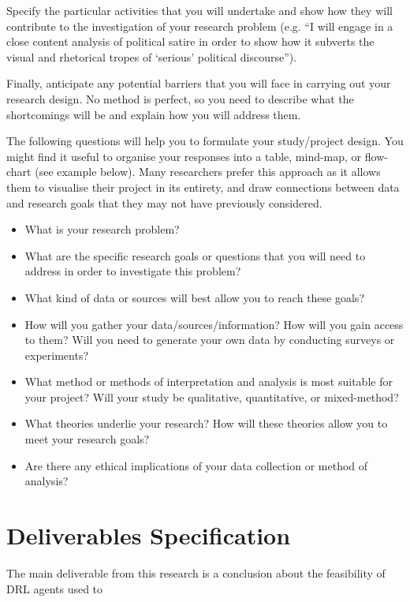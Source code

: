 \documentclass[12pt, a4paper]{article}
\begin{document}
Specify the particular activities that you will undertake and show how they will contribute to the investigation of your research problem (e.g. “I will engage in a close content analysis of political satire in order to show how it subverts the visual and rhetorical tropes of ‘serious’ political discourse”).

Finally, anticipate any potential barriers that you will face in carrying out your research design. No method is perfect, so you need to describe what the shortcomings will be and explain how you will address them.

The following questions will help you to formulate your study/project design. You might find it useful to organise your responses into a table, mind-map, or flow-chart (see example below). Many researchers prefer this approach as it allows them to visualise their project in its entirety, and draw connections between data and research goals that they may not have previously considered.
\begin{itemize}
\item What is your research problem?
\item What are the specific research goals or questions that you will need to address in order to investigate this problem?
\item What kind of data or sources will best allow you to reach these goals?
\item How will you gather your data/sources/information? How will you gain access to them? Will you need to generate your own data by conducting surveys or experiments?
\item What method or methods of interpretation and analysis is most suitable for your project? Will your study be qualitative, quantitative, or mixed-method?
\item What theories underlie your research? How will these theories allow you to meet your research goals?
\item Are there any ethical implications of your data collection or method of analysis?
\end{itemize}


\section{Deliverables Specification}
The main deliverable from this research is a conclusion about the feasibility of DRL agents used to 
\end{document}
